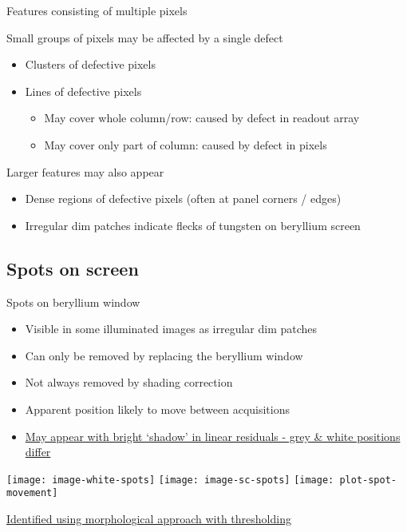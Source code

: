 \documentclass[8pt]{beamer}
\newcommand{\todo}[1]{
	\begin{minipage}{\textwidth}
	\begin{footnotesize}
	\textcolor{purple}{
					\begin{tabular}{p{0.01\textwidth}p{0.95\textwidth}}
						$\bullet$ & #1
					\end{tabular}
					}
	\end{footnotesize}
	\end{minipage}
}
\begin{document}
\begin{frame}{Features consisting of multiple pixels}

Small groups of pixels may be affected by a single defect
	\begin{itemize}
		\item Clusters of defective pixels
		\item Lines of defective pixels
		\begin{itemize}
			\item May cover whole column/row: caused by defect in readout array
			\item May cover only part of column: caused by defect in pixels
		\end{itemize}
	\end{itemize}
	
	\vspace{12pt}
Larger features may also appear
	\begin{itemize}
		\item Dense regions of defective pixels (often at panel corners / edges)
		\item Irregular dim patches indicate flecks of tungsten on beryllium screen
	\end{itemize}
\end{frame}

\subsection{Spots on screen}

\begin{frame}[label = screen-spots]{Spots on beryllium window}
	\begin{itemize}
		\item Visible in some illuminated images as irregular dim patches
		\item Can only be removed by replacing the beryllium window
		\item Not always removed by shading correction
		\item Apparent position likely to move between acquisitions	%
		\item \hyperlink{app-screen-spots}{May appear with bright `shadow' in linear residuals - grey \& white positions differ}
	\end{itemize}
	\vspace{-10pt}
	\begin{center}
		\texttt{[image: image-white-spots]}
		\texttt{[image: image-sc-spots]}
		\texttt{[image: plot-spot-movement]}
	\end{center}
		\vspace{-10pt}
	\hyperlink{app-screen-spots-procedure}{Identified using morphological approach with thresholding}
\end{frame}
\end{document}
